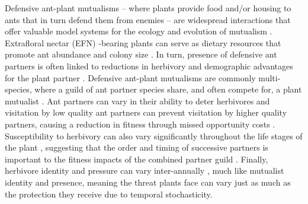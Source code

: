 \documentclass[11pt]{article}
\begin{document}
Defensive ant-plant mutualisms -- where plants provide food and/or housing to ants that in turn defend them from enemies -- are widespread interactions that offer valuable model systems for the ecology and evolution of mutualism \citep{Bronstein1998, Bronstein2006}. 
Extrafloral nectar (EFN) -bearing plants can serve as dietary resources that promote ant abundance and colony size \citep{Byk2011, Ness2009, Ness2006, Donald2022}.
In turn, presence of defensive ant partners is often linked to reductions in herbivory  \citep{Trager2010, Rudgers2004} and demographic advantages for the plant partner \citep{Baez2016}.
Defensive ant-plant mutualisms are commonly multi-species, where a guild of ant partner species share, and often compete for, a plant mutualist \citep{Bronstein1998, Beattie1985, Trager2010, Agrawal1998}.
Ant partners can vary in their ability to deter herbivores \citep{Bruna2014} and visitation by low quality ant partners can prevent visitation by higher quality partners, causing a reduction in fitness through missed opportunity costs \citep{Fraser2001, Frederickson2005}.
Susceptibility to herbivory can also vary significantly throughout the life stages of the plant \citep{Boege2005}, suggesting that the order and timing of successive partners is important to the fitness impacts of the combined partner guild \citep{Barton2010, Boege2005, Fonseca2003}.
Finally, herbivore identity and pressure can vary inter-annually \citep{Wetzel2023}, much like mutualist identity and presence, meaning the threat plants face can vary just as much as the protection they receive due to temporal stochasticity. 
\end{document}
